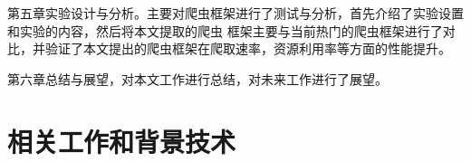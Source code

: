 \documentclass[master]{njuthesis}
\begin{document}
第五章实验设计与分析。主要对爬虫框架进行了测试与分析，首先介绍了实验设置和实验的内容，然后将本文提取的爬虫
框架主要与当前热门的爬虫框架进行了对比，并验证了本文提出的爬虫框架在爬取速率，资源利用率等方面的性能提升。

第六章总结与展望，对本文工作进行总结，对未来工作进行了展望。




\chapter{相关工作和背景技术}\label{chapter_relevantwork}







\end{document}
